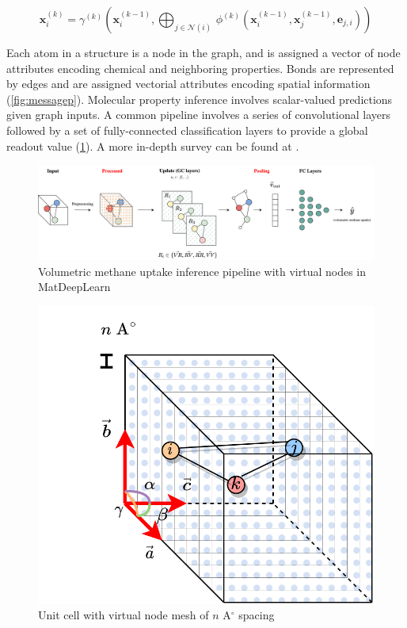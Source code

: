 \documentclass{lxaiproposal}
\begin{document}
\begin{equation}
    \mathbf{x}_i^{(k)} = \gamma^{(k)} \left( \mathbf{x}_i^{(k-1)}, \bigoplus_{j \in \mathcal{N}(i)} \, \phi^{(k)}\left(\mathbf{x}_i^{(k-1)}, \mathbf{x}_j^{(k-1)},\mathbf{e}_{j,i}\right) \right)
    \label{eq:mpupdate}
\end{equation}

Each atom in a structure is a node in the graph, and is assigned a vector of node attributes encoding chemical and neighboring properties. Bonds are represented by edges and are assigned vectorial attributes encoding spatial information (\ref{fig:messagep}). Molecular property inference involves scalar-valued predictions given graph inputs. A common pipeline involves a series of convolutional layers followed by a set of fully-connected classification layers to provide a global readout value (\ref{fig:pipeline}). A more in-depth survey can be found at \cite{sanchez-lengeling2021a}.

\begin{figure}[h]
    \centering
    \includegraphics[width=\textwidth]{mdl-vn-pipeline.drawio.png}
    \caption{Volumetric methane uptake inference pipeline with virtual nodes in MatDeepLearn\cite{fung2021benchmarking}}
    \label{fig:pipeline}
\end{figure}

\begin{figure}
    \centering
    \includegraphics[scale=0.15]{unitcell-vn.drawio.png}
    \caption{Unit cell with virtual node mesh of $n$ A$^\circ$ spacing}
    \label{fig:unitcell}
\end{figure}
\end{document}
